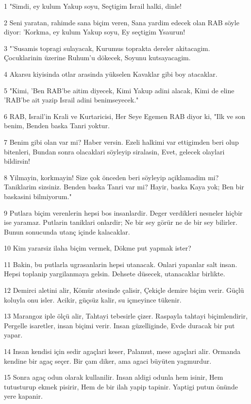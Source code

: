 \par 1 "Simdi, ey kulum Yakup soyu, Seçtigim Israil halki, dinle!
\par 2 Seni yaratan, rahimde sana biçim veren, Sana yardim edecek olan RAB söyle diyor: 'Korkma, ey kulum Yakup soyu, Ey seçtigim Ysaurun!
\par 3 "'Susamis topragi sulayacak, Kurumus toprakta dereler akitacagim. Çocuklarinin üzerine Ruhum'u dökecek, Soyunu kutsayacagim.
\par 4 Akarsu kiyisinda otlar arasinda yükselen Kavaklar gibi boy atacaklar.
\par 5 "Kimi, 'Ben RAB'be aitim diyecek, Kimi Yakup adini alacak, Kimi de eline 'RAB'be ait yazip Israil adini benimseyecek."
\par 6 RAB, Israil'in Krali ve Kurtaricisi, Her Seye Egemen RAB diyor ki, "Ilk ve son benim, Benden baska Tanri yoktur.
\par 7 Benim gibi olan var mi? Haber versin. Ezeli halkimi var ettigimden beri olup bitenleri, Bundan sonra olacaklari söyleyip siralasin, Evet, gelecek olaylari bildirsin!
\par 8 Yilmayin, korkmayin! Size çok önceden beri söyleyip açiklamadim mi? Taniklarim sizsiniz. Benden baska Tanri var mi? Hayir, baska Kaya yok; Ben bir baskasini bilmiyorum."
\par 9 Putlara biçim verenlerin hepsi bos insanlardir. Deger verdikleri nesneler hiçbir ise yaramaz. Putlarin taniklari onlardir; Ne bir sey görür ne de bir sey bilirler. Bunun sonucunda utanç içinde kalacaklar.
\par 10 Kim yararsiz ilaha biçim vermek, Dökme put yapmak ister?
\par 11 Bakin, bu putlarla ugrasanlarin hepsi utanacak. Onlari yapanlar salt insan. Hepsi toplanip yargilanmaya gelsin. Dehsete düsecek, utanacaklar birlikte.
\par 12 Demirci aletini alir, Kömür atesinde çalisir, Çekiçle demire biçim verir. Güçlü koluyla onu isler. Acikir, güçsüz kalir, su içmeyince tükenir.
\par 13 Marangoz iple ölçü alir, Tahtayi tebesirle çizer. Raspayla tahtayi biçimlendirir, Pergelle isaretler, insan biçimi verir. Insan güzelliginde, Evde duracak bir put yapar.
\par 14 Insan kendisi için sedir agaçlari keser, Palamut, mese agaçlari alir. Ormanda kendine bir agaç seçer. Bir çam diker, ama agaci büyüten yagmurdur.
\par 15 Sonra agaç odun olarak kullanilir. Insan aldigi odunla hem isinir, Hem tutusturup ekmek pisirir, Hem de bir ilah yapip tapinir. Yaptigi putun önünde yere kapanir.
